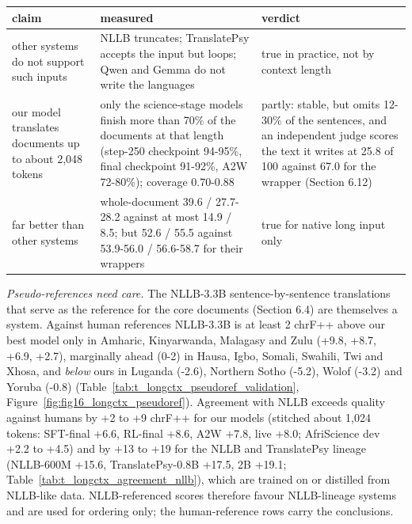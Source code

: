{\def\LTcaptype{none} %
\begin{longtable}[]{@{}
  >{\raggedright\arraybackslash}p{}
  >{\raggedright\arraybackslash}p{}
  >{\raggedright\arraybackslash}p{}@{}}
\toprule\noalign{}
\begin{minipage}[b]{\linewidth}\raggedright
claim
\end{minipage} & \begin{minipage}[b]{\linewidth}\raggedright
measured
\end{minipage} & \begin{minipage}[b]{\linewidth}\raggedright
verdict
\end{minipage} \\
\midrule\noalign{}
\endhead
\bottomrule\noalign{}
\endlastfoot
other systems do not support such inputs & NLLB truncates; TranslatePsy accepts the input but loops; Qwen and Gemma do not write the languages & true in practice, not by context length \\
our model translates documents up to about 2,048 tokens & only the science-stage models finish more than 70\% of the documents at that length (step-250 checkpoint 94-95\%, final checkpoint 91-92\%, A2W 72-80\%); coverage 0.70-0.88 & partly: stable, but omits 12-30\% of the sentences, and an independent judge scores the text it writes at 25.8 of 100 against 67.0 for the wrapper (Section 6.12) \\
far better than other systems & whole-document 39.6 / 27.7-28.2 against at most 14.9 / 8.5; but 52.6 / 55.5 against 53.9-56.0 / 56.6-58.7 for their wrappers & true for native long input only \\
\end{longtable}
}

\emph{Pseudo-references need care.} The NLLB-3.3B sentence-by-sentence translations that serve as the reference for the core documents (Section 6.4) are themselves a system. Against human references NLLB-3.3B is at least 2 chrF++ above our best model only in Amharic, Kinyarwanda, Malagasy and Zulu (+9.8, +8.7, +6.9, +2.7), marginally ahead (0-2) in Hausa, Igbo, Somali, Swahili, Twi and Xhosa, and \emph{below} ours in Luganda (-2.6), Northern Sotho (-5.2), Wolof (-3.2) and Yoruba (-0.8) (Table~\ref{tab:t_longctx_pseudoref_validation}, Figure~\ref{fig:fig16_longctx_pseudoref}). Agreement with NLLB exceeds quality against humans by +2 to +9 chrF++ for our models (stitched about 1,024 tokens: SFT-final +6.6, RL-final +8.6, A2W +7.8, live +8.0; AfriScience dev +2.2 to +4.5) and by +13 to +19 for the NLLB and TranslatePsy lineage (NLLB-600M +15.6, TranslatePsy-0.8B +17.5, 2B +19.1; Table~\ref{tab:t_longctx_agreement_nllb}), which are trained on or distilled from NLLB-like data. NLLB-referenced scores therefore favour NLLB-lineage systems and are used for ordering only; the human-reference rows carry the conclusions.

